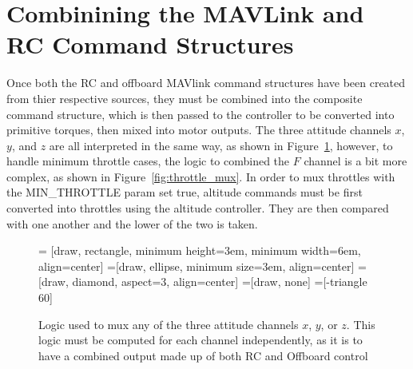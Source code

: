 \documentclass[paper=a4, fontsize=11pt]{scrartcl} %
\begin{document}
\section{Combinining the MAVLink and RC Command Structures}

Once both the RC and offboard MAVlink command structures have been created from thier respective sources, they must be combined into the composite command structure, which is then passed to the controller to be converted into primitive torques, then mixed into motor outputs.  The three attitude channels $x$, $y$, and $z$ are all interpreted in the same way, as shown in Figure~\ref{fig:attitude_mux}, however, to handle minimum throttle cases, the logic to combined the $F$ channel is a bit more complex, as shown in Figure~\ref{fig:throttle_mux}.  In order to mux throttles with the MIN\_THROTTLE param set true, altitude commands must be first converted into throttles using the altitude controller.  They are then compared with one another and the lower of the two is taken.

\begin{figure}[h]
\centering
	 = [draw, rectangle, 
    					minimum height=3em, minimum width=6em, align=center]
  =[draw, ellipse, minimum size=3em,
    					align=center]
  =[draw, diamond, aspect=3, align=center]
  =[draw, none]
  =[-triangle 60]

  \begin{adjustbox}{max size={\textwidth}{\textheight}}
  \end{adjustbox}

  \caption{Logic used to mux any of the three attitude channels $x$, $y$, or $z$.  This logic must be computed for each channel independently, as it is to have a combined output made up of both RC and Offboard control}
  \label{fig:attitude_mux}
\end{figure}
\end{document}
